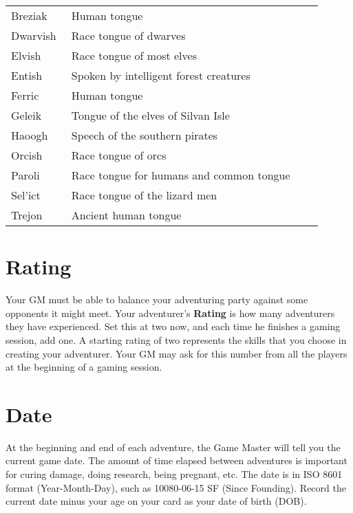 \begin{multicols*}{2}
\begin{tcolorbox}[breakable,boxrule=0pt,title=\textbf{Languages}]
\begin{tabular}{@{}p{0.18\linewidth} p{0.75\linewidth}}
Breziak & Human tongue\\
Dwarvish & Race tongue of dwarves\\
Elvish & Race tongue of most elves\\
Entish & Spoken by intelligent forest creatures\\
Ferric & Human tongue\\
Geleik & Tongue of the elves of Silvan Isle\\
Haoogh & Speech of the southern pirates\\
Orcish & Race tongue of orcs\\
Paroli & Race tongue for humans and common tongue\\
Sel'ict & Race tongue of the lizard men\\
Trejon & Ancient human tongue\\
\end{tabular}
\end{tcolorbox}
\section{Rating}
Your GM must be able to balance your adventuring party against some opponents it might meet. Your adventurer's \textbf{Rating} is how many adventurers they have experienced. Set this at two now, and each time he finishes a gaming session, add one. A starting rating of two represents the skills that you choose in creating your adventurer. Your GM may ask for this number from all the players at the beginning of a gaming session.
\section{Date}
At the beginning and end of each adventure, the Game Master will tell you the current game date. The amount of time elapsed between adventures is important for curing damage, doing research, being pregnant, etc. The date is in ISO 8601 format (Year-Month-Day), such as 10080-06-15 SF (Since Founding). Record the current date minus your age on your card as your date of birth (DOB).

\end{multicols*}
